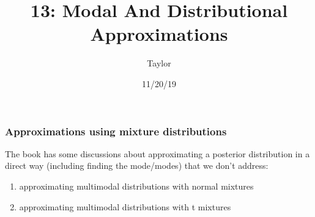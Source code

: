 \documentclass{beamer}
\title["13"]{13: Modal And Distributional Approximations}
\author{Taylor}
\date{11/20/19}
\begin{document}

\begin{frame}
\titlepage 
\end{frame}







\begin{frame}
\frametitle{Approximations using mixture distributions}

The book has some discussions about approximating a posterior
distribution in a direct way (including finding the mode/modes) that we don't address:

\begin{enumerate}
\item approximating multimodal distributions with normal mixtures
\item approximating multimodal distributions with t mixtures
\end{enumerate}

\end{frame}
\end{document}
